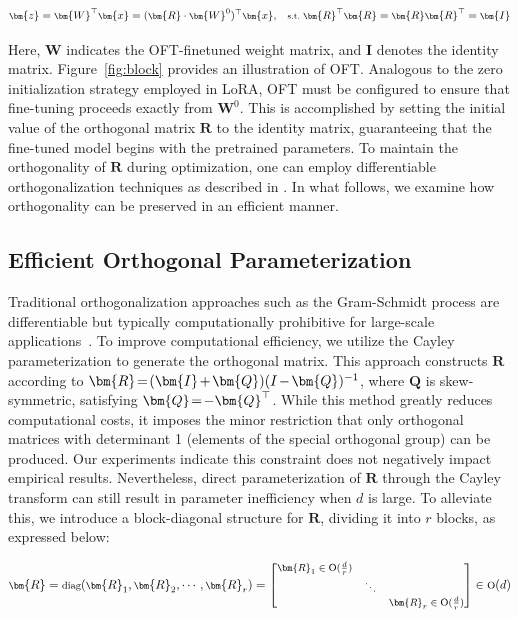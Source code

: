 \begin{equation}\label{eq:oft_general}
    \footnotesize
    \bm{z}=\bm{W}^\top\bm{x}=(\bm{R}\cdot\bm{W}^0)^\top\bm{x},~~~\text{s.t.}~\bm{R}^\top\bm{R}=\bm{R}\bm{R}^\top=\bm{I}
\end{equation}

Here, $\bm{W}$ indicates the OFT-finetuned weight matrix, and $\bm{I}$ denotes the identity matrix. Figure~\ref{fig:block} provides an illustration of OFT. Analogous to the zero initialization strategy employed in LoRA, OFT must be configured to ensure that fine-tuning proceeds exactly from $\bm{W}^0$. This is accomplished by setting the initial value of the orthogonal matrix $\bm{R}$ to the identity matrix, guaranteeing that the fine-tuned model begins with the pretrained parameters. To maintain the orthogonality of $\bm{R}$ during optimization, one can employ differentiable orthogonalization techniques as described in \cite{liu2021orthogonal,lezcano2019cheap}. In what follows, we examine how orthogonality can be preserved in an efficient manner.

\subsection{Efficient Orthogonal Parameterization}\label{sect:eff_ortho}

Traditional orthogonalization approaches such as the Gram-Schmidt process are differentiable but typically computationally prohibitive for large-scale applications~\cite{liu2021orthogonal}. To improve computational efficiency, we utilize the Cayley parameterization to generate the orthogonal matrix. This approach constructs $\bm{R}$ according to $\thickmuskip=2mu \medmuskip=2mu \bm{R}=(\bm{I}+\bm{Q})(I-\bm{Q})^{-1}$, where $\bm{Q}$ is skew-symmetric, satisfying $\thickmuskip=2mu \medmuskip=2mu \bm{Q}=-\bm{Q}^\top$. While this method greatly reduces computational costs, it imposes the minor restriction that only orthogonal matrices with determinant 1 (elements of the special orthogonal group) can be produced. Our experiments indicate this constraint does not negatively impact empirical results. Nevertheless, direct parameterization of $\bm{R}$ through the Cayley transform can still result in parameter inefficiency when $d$ is large. To alleviate this, we introduce a block-diagonal structure for $\bm{R}$, dividing it into $r$ blocks, as expressed below:

\begin{equation}
    \footnotesize
    \bm{R}=\text{diag}(\bm{R}_1,\bm{R}_2,\cdots,\bm{R}_r)=\begin{bmatrix}
    \bm{R}_1\in \text{O}(\frac{d}{r}) &  &\\
    &\ddots & \\
    & & \bm{R}_r\in \text{O}(\frac{d}{r})
    \end{bmatrix}\in \text{O}(d)
\end{equation}


